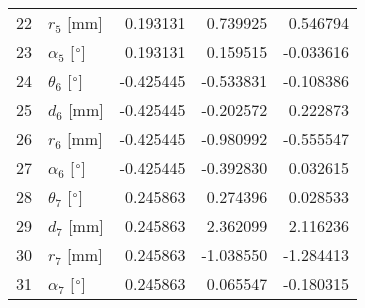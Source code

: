 \documentclass{standalone}%
\begin{document}
\begin{tabular}{llrrr}
22 &              $r_{5}$ [mm] &  0.193131 &   0.739925 &   0.546794 \\
23 &  $\alpha_{5}$ [$\degree$] &  0.193131 &   0.159515 &  -0.033616 \\
24 &  $\theta_{6}$ [$\degree$] & -0.425445 &  -0.533831 &  -0.108386 \\
25 &              $d_{6}$ [mm] & -0.425445 &  -0.202572 &   0.222873 \\
26 &              $r_{6}$ [mm] & -0.425445 &  -0.980992 &  -0.555547 \\
27 &  $\alpha_{6}$ [$\degree$] & -0.425445 &  -0.392830 &   0.032615 \\
28 &  $\theta_{7}$ [$\degree$] &  0.245863 &   0.274396 &   0.028533 \\
29 &              $d_{7}$ [mm] &  0.245863 &   2.362099 &   2.116236 \\
30 &              $r_{7}$ [mm] &  0.245863 &  -1.038550 &  -1.284413 \\
31 &  $\alpha_{7}$ [$\degree$] &  0.245863 &   0.065547 &  -0.180315 \\
\bottomrule
\end{tabular}
%
\end{document}
